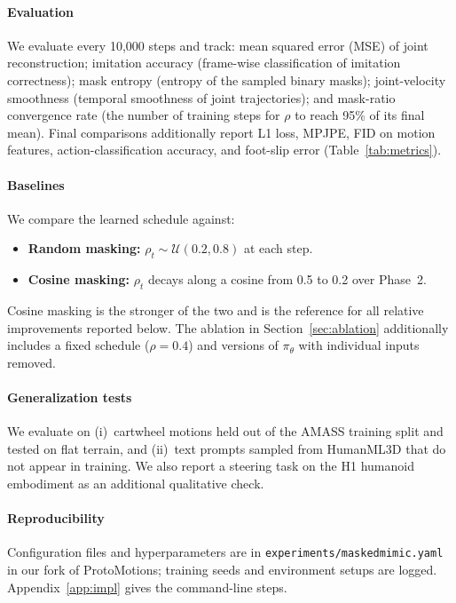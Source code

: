 \documentclass[10pt,letterpaper]{article}
\newcommand{\pth}{\pi_{\theta}}
\begin{document}
\paragraph{Evaluation}
We evaluate every 10{,}000 steps and track: mean squared error (MSE) of joint reconstruction; imitation accuracy (frame-wise classification of imitation correctness); mask entropy (entropy of the sampled binary masks); joint-velocity smoothness (temporal smoothness of joint trajectories); and mask-ratio convergence rate (the number of training steps for $\rho$ to reach 95\% of its final mean). Final comparisons additionally report L1 loss, MPJPE, FID on motion features, action-classification accuracy, and foot-slip error (Table~\ref{tab:metrics}).

\paragraph{Baselines}
We compare the learned schedule against:
\begin{itemize}
  \item \textbf{Random masking:} $\rho_t \sim \mathcal{U}(0.2, 0.8)$ at each step.
  \item \textbf{Cosine masking:} $\rho_t$ decays along a cosine from 0.5 to 0.2 over Phase~2.
\end{itemize}
Cosine masking is the stronger of the two and is the reference for all relative improvements reported below. The ablation in Section~\ref{sec:ablation} additionally includes a fixed schedule ($\rho = 0.4$) and versions of $\pth$ with individual inputs removed.

\paragraph{Generalization tests}
We evaluate on (i)~cartwheel motions held out of the AMASS training split and tested on flat terrain, and (ii)~text prompts sampled from HumanML3D that do not appear in training. We also report a steering task on the H1 humanoid embodiment as an additional qualitative check.

\paragraph{Reproducibility}
Configuration files and hyperparameters are in \texttt{experiments/maskedmimic.yaml} in our fork of ProtoMotions; training seeds and environment setups are logged. Appendix~\ref{app:impl} gives the command-line steps.
\end{document}
